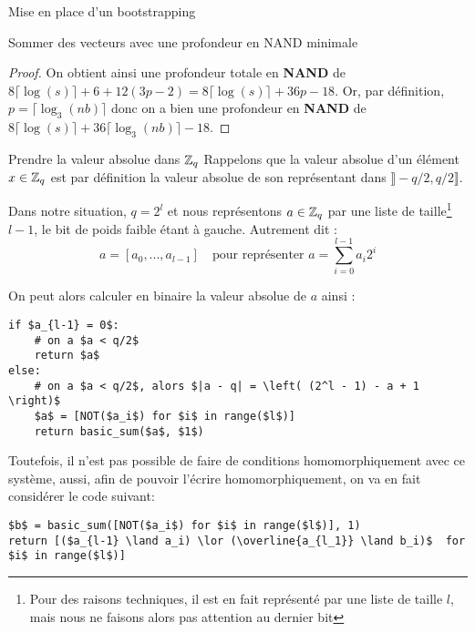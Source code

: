 \begin{section}{Mise en place d'un bootstrapping}
\begin{subsection}{Sommer des vecteurs avec une profondeur en NAND minimale}
\begin{proof}

	On obtient ainsi une profondeur totale en \textbf{NAND} de $8 \lceil
	\log(s)\rceil +
	6+
	12(3p - 2) = 8 \lceil \log(s) \rceil + 36p -18$. Or, par définition, $p = \lceil \log_3(nb)
	\rceil$ donc on a bien une profondeur en \textbf{NAND} de $8 \lceil
	\log(s) \rceil +
	36\lceil\log_3(nb)\rceil -18$.
\end{proof}

\end{subsection}
\begin{subsection}{Prendre la valeur absolue dans $\mathbb{Z}_q$}
	Rappelons que la valeur absolue d'un élément $x\in \mathbb{Z}_q$ est par définition la valeur absolue de son représentant dans $\rrbracket -q/2, q/2\rrbracket$. 
	
	Dans notre situation, $q = 2^l$ et nous représentons $a\in \mathbb{Z}_q$ par une liste de taille\footnote{Pour des raisons techniques, il est en fait représenté par une liste de taille $l$, mais nous ne faisons alors pas attention au dernier bit} $l-1$, le bit de poids faible étant à gauche. Autrement dit :
\[ a = [a_0, ..., a_{l-1}] \quad \text{pour représenter } a = \sum_{i=0}^{l-1} a_i 2^i\]

	On peut alors calculer en binaire la valeur absolue de $a$ ainsi :

\vspace{0.5cm}
\begin{lstlisting}
if $a_{l-1} = 0$: 
	# on a $a < q/2$
	return $a$
else:
	# on a $a < q/2$, alors $|a - q| = \left( (2^l - 1) - a + 1 \right)$
	$a$ = [NOT($a_i$) for $i$ in range($l$)]
	return basic_sum($a$, $1$)
\end{lstlisting}

	Toutefois, il n'est pas possible de faire de conditions homomorphiquement avec ce système, aussi, afin de pouvoir l'écrire homomorphiquement, on va en fait considérer le code suivant:

\vspace{0.5cm}
\begin{lstlisting}
$b$ = basic_sum([NOT($a_i$) for $i$ in range($l$)], 1)
return [($a_{l-1} \land a_i) \lor (\overline{a_{l_1}} \land b_i)$  for $i$ in range($l$)]
\end{lstlisting}


\end{subsection}
\end{section}
